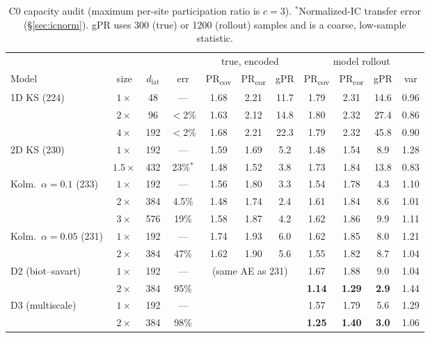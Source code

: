 \documentclass[11pt]{article}
\begin{document}
\begin{table}[h]
\centering
\footnotesize
\setlength{\tabcolsep}{4pt}
\begin{tabular}{lccc|ccc|cccc}
\toprule
 & & & & \multicolumn{3}{c|}{true, encoded} & \multicolumn{4}{c}{model rollout} \\
Model & size & $d_{\mathrm{lat}}$ & err & PR\textsubscript{cov} & PR\textsubscript{cor} & gPR & PR\textsubscript{cov} & PR\textsubscript{cor} & gPR & var \\
\midrule
1D KS (224) & $1\times$ & 48 & --- & 1.68 & 2.21 & 11.7 & 1.79 & 2.31 & 14.6 & 0.96 \\
 & $2\times$ & 96 & $<$2\% & 1.63 & 2.12 & 14.8 & 1.80 & 2.32 & 27.4 & 0.86 \\
 & $4\times$ & 192 & $<$2\% & 1.68 & 2.21 & 22.3 & 1.79 & 2.32 & 45.8 & 0.90 \\
\midrule
2D KS (230) & $1\times$ & 192 & --- & 1.59 & 1.69 & 5.2 & 1.48 & 1.54 & 8.9 & 1.28 \\
 & $1.5\times$ & 432 & 23\%$^*$ & 1.48 & 1.52 & 3.8 & 1.73 & 1.84 & 13.8 & 0.83 \\
\midrule
Kolm.\ $\alpha{=}0.1$ (233) & $1\times$ & 192 & --- & 1.56 & 1.80 & 3.3 & 1.54 & 1.78 & 4.3 & 1.10 \\
 & $2\times$ & 384 & 4.5\% & 1.48 & 1.74 & 2.4 & 1.61 & 1.84 & 8.6 & 1.01 \\
 & $3\times$ & 576 & 19\% & 1.58 & 1.87 & 4.2 & 1.62 & 1.86 & 9.9 & 1.11 \\
\midrule
Kolm.\ $\alpha{=}0.05$ (231) & $1\times$ & 192 & --- & 1.74 & 1.93 & 6.0 & 1.62 & 1.85 & 8.0 & 1.21 \\
 & $2\times$ & 384 & 47\% & 1.62 & 1.90 & 5.6 & 1.55 & 1.82 & 8.7 & 1.04 \\
D2 (biot--savart) & $1\times$ & 192 & --- & \multicolumn{3}{c|}{(same AE as 231)} & 1.67 & 1.88 & 9.0 & 1.04 \\
 & $2\times$ & 384 & 95\% & & & & \textbf{1.14} & \textbf{1.29} & \textbf{2.9} & 1.44 \\
D3 (multiscale) & $1\times$ & 192 & --- & & & & 1.57 & 1.79 & 5.6 & 1.29 \\
 & $2\times$ & 384 & 98\% & & & & \textbf{1.25} & \textbf{1.40} & \textbf{3.0} & 1.06 \\
\bottomrule
\end{tabular}
\caption{C0 capacity audit (maximum per-site participation ratio is
$c{=}3$). $^*$Normalized-IC transfer error (\S\ref{sec:icnorm}). gPR uses
300 (true) or 1200 (rollout) samples and is a coarse, low-sample
statistic.}
\label{tab:c0}
\end{table}
\end{document}
